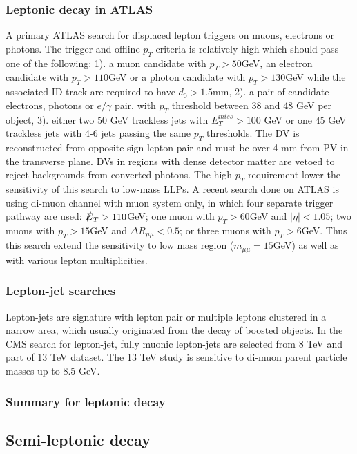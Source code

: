 \subsubsection{Leptonic decay in ATLAS}
 A primary ATLAS search for displaced lepton triggers on muons, electrons or photons. The trigger and offline $p_T$ criteria is relatively high which should pass one of the following: 1). a muon candidate with $p_T > 50$GeV, an electron candidate with $p_T >110$GeV or a photon candidate with $p_T > 130$GeV while the associated ID track are required to have $d_0 > 1.5$mm, 2). a pair of candidate electrons, photons or $e/\gamma$ pair, with $p_T$ threshold between 38 and 48 GeV per object, 3). either two 50 GeV trackless jets with $E_T^{miss} > 100$ GeV or one 45 GeV trackless jets with 4-6 jets passing the same $p_T$ thresholds.  The DV is reconstructed from opposite-sign lepton pair and must be over 4 mm from PV in the transverse plane. DVs in regions with dense detector matter are vetoed to reject backgrounds from converted photons. The high $p_T$ requirement lower the sensitivity of this search to low-mass LLPs.
  A recent search done on ATLAS is using di-muon channel with muon system only, in which four separate trigger pathway are used: $\slashed{E}_T > 110 $GeV; one muon with $p_T > 60$GeV and $|\eta|<1.05$; two muons with $p_T > 15$GeV and $\Delta R_{\mu\mu}<0.5$; or three muons with $p_T > 6$GeV. Thus this search extend the sensitivity to low mass region ($m_{\mu\mu}=15$GeV) as well as with various lepton multiplicities.

\subsubsection{Lepton-jet searches}
Lepton-jets are signature with lepton pair or multiple leptons clustered in a narrow area, which usually originated from the decay of boosted objects. In the CMS search for lepton-jet, fully muonic lepton-jets are selected from 8 TeV and part of 13 TeV dataset. The 13 TeV study is sensitive to di-muon parent particle masses up to 8.5 GeV.

\subsubsection{Summary for leptonic decay}

\subsection{Semi-leptonic decay}

